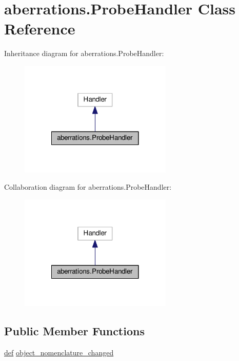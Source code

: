 \hypertarget{classaberrations_1_1_probe_handler}{\section{aberrations.\-Probe\-Handler Class Reference}
\label{classaberrations_1_1_probe_handler}
}


Inheritance diagram for aberrations.\-Probe\-Handler\-:
\nopagebreak
\begin{figure}[H]
\begin{center}
\leavevmode
\includegraphics[width=206pt]{classaberrations_1_1_probe_handler__inherit__graph}
\end{center}
\end{figure}


Collaboration diagram for aberrations.\-Probe\-Handler\-:
\nopagebreak
\begin{figure}[H]
\begin{center}
\leavevmode
\includegraphics[width=206pt]{classaberrations_1_1_probe_handler__coll__graph}
\end{center}
\end{figure}
\subsection*{Public Member Functions}
\begin{DoxyCompactItemize}
\item 
\hyperlink{sim_image_from_wave_8m_a72b6b8e83430abf007f20aeae4dc2f74}{def} \hyperlink{classaberrations_1_1_probe_handler_a49796696fa2c1b5319b6bf5ca03e379d}{object\-\_\-nomenclature\-\_\-changed}
\end{DoxyCompactItemize}


